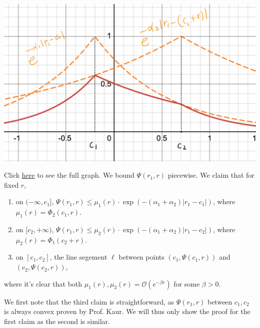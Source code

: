 \documentclass[12pt]{article}
\begin{document}
\begin{center}
    \includegraphics[scale=0.21]{figure1.jpeg}
\end{center}
Click \href{https://www.desmos.com/calculator/zuqivaujt4}{\underline{here}} to see the full graph.
We bound \(\Psi(r_1,r)\) piecewise. We claim that for fixed \(r\),
\begin{enumerate}
    \item on \((-\infty, c_1]\), \(\Psi(r_1,r) \leq \mu_1(r) \cdot \exp(-(\alpha_1 + \alpha_2)|r_1-c_1|)\), where \(\mu_1(r) = \Phi_2(c_1,r)\).
    \item on \([c_2,+\infty)\), \(\Psi(r_1,r) \leq \mu_2(r) \cdot \exp(-(\alpha_1 + \alpha_2)|r_1-c_2|)\), where \(\mu_2(r) = \Phi_1(c_2+r).\)
    \item on \([c_1,c_2]\), the line segement \(\ell\) between points \((c_1, \Psi(c_1,r))\) and \((c_2, \Psi(c_2,r))\),
\end{enumerate}
where it's clear that both \(\mu_1(r), \mu_2(r) = \mathcal{O}(e^{-\beta r})\) for some \(\beta > 0\).

We first note that the third claim is straightforward, as \(\Psi(r_1,r)\) between \(c_1,c_2\) is always convex proven by Prof. Kaur. We will thus only show the proof for the first claim as the second is similar.
\end{document}
